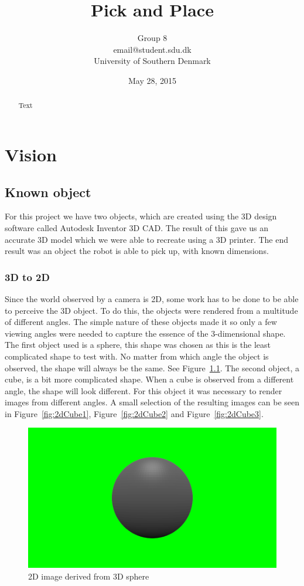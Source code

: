 \documentclass{report}
\begin{document}
\newpage

\title{Pick and Place}
\author{Group 8\\\small{email@student.sdu.dk}\\University of Southern Denmark}
\date{May 28, 2015}
\maketitle

\begin{abstract}
Text
\end{abstract}

\tableofcontents
\pagebreak

\chapter{Vision}
\section{Known object}
For this project we have two objects, which are created using the 3D design software called Autodesk Inventor 3D CAD. The result of this gave us an accurate 3D model which we were able to recreate using a 3D printer. The end result was an object the robot is able to pick up, with known dimensions.

\subsection{3D to 2D}
Since the world observed by a camera is 2D, some work has to be done to be able to perceive the 3D object. To do this, the objects were rendered from a multitude of different angles. The simple nature of these objects made it so only a few viewing angles were needed to capture the essence of the 3-dimensional shape.
The first object used is a sphere, this shape was chosen as this is the least complicated shape to test with. No matter from which angle the object is observed, the shape will always be the same. See Figure~\ref{fig:2dSphere}.
The second object, a cube, is a bit more complicated shape. When a cube is observed from a different angle, the shape will look different. For this object it was necessary to render images from different angles. A small selection of the resulting images can be seen in Figure~\ref{fig:2dCube1}, Figure~\ref{fig:2dCube2} and Figure~\ref{fig:2dCube3}.

\begin{figure}[h!]
\center
\includegraphics[width=.5\textwidth]{../images/0001.png}
\caption[]{2D image derived from 3D sphere}
\label{fig:2dSphere}
\end{figure}
\end{document}
